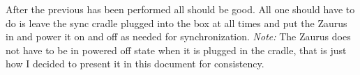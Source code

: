 \documentclass{article}
\begin{document}
After the previous has been performed all should be good. All one should
have to do is leave the sync cradle plugged into the box at all times and
put the Zaurus in and power it on and off as needed for
synchronization. \emph{Note:} The Zaurus does not have to be in powered
off state when it is plugged in the cradle, that is just how I decided
to present it in this document for consistency.



\end{document}
